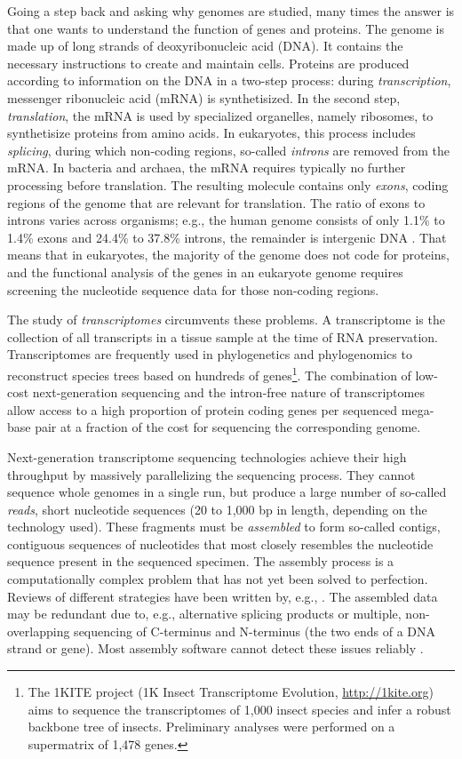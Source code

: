 Going a step back and asking why genomes are studied, many times the answer is
that one wants to understand the function of genes and proteins. The genome is
made up of long strands of deoxyribonucleic acid (DNA). It contains the
necessary instructions to create and maintain cells.  Proteins are produced
according to information on the DNA in a two-step process: during
\emph{transcription}, messenger ribonucleic acid (mRNA) is synthetisized. In the
second step, \emph{translation}, the mRNA is used by specialized organelles,
namely ribosomes, to synthetisize proteins from amino acids. In eukaryotes, this
process includes \emph{splicing}, during which non-coding regions, so-called
\emph{introns} are removed from the mRNA. In bacteria and archaea, the mRNA
requires typically no further processing before translation. The resulting
molecule contains only \emph{exons}, coding regions of the genome that are
relevant for translation. The ratio of exons to introns varies across organisms;
e.g., the human genome consists of only 1.1\% to 1.4\% exons and 24.4\% to
37.8\% introns, the remainder is intergenic DNA \citep{venter2001}. That means
that in eukaryotes, the majority of the genome does not code for proteins, and
the functional analysis of the genes in an eukaryote genome requires screening
the nucleotide sequence data for those non-coding regions.

The study of \emph{transcriptomes} circumvents these problems. A transcriptome
is the collection of all transcripts in a tissue sample at the time of RNA
preservation.  Transcriptomes are frequently used in phylogenetics and
phylogenomics to reconstruct species trees based on hundreds of
genes\footnote{The 1KITE project (1K Insect Transcriptome Evolution,
\url{http://1kite.org}) aims to sequence the transcriptomes of 1,000 insect
species and infer a robust backbone tree of insects. Preliminary analyses were
performed on a supermatrix of 1,478 genes.}.  The combination of low-cost
next-generation sequencing and the intron-free nature of transcriptomes allow
access to a high proportion of protein coding genes per sequenced mega-base pair
at a fraction of the cost for sequencing the corresponding genome.

Next-generation transcriptome sequencing technologies achieve their high
throughput by massively parallelizing the sequencing process. They cannot
sequence whole genomes in a single run, but produce a large number of so-called
\emph{reads}, short nucleotide sequences (20 to 1,000 bp in length, depending on
the technology used). These fragments must be \emph{assembled} to form so-called
contigs, contiguous sequences of nucleotides that most closely resembles the
nucleotide sequence present in the sequenced specimen. The assembly process is a
computationally complex problem that has not yet been solved to perfection.
Reviews of different strategies have been written by, e.g., \citet{zhang2011}.
The assembled data may be redundant due to, e.g., alternative splicing products
\citep{black2003} or multiple, non-overlapping sequencing of C-terminus and
N-terminus (the two ends of a DNA strand or gene). Most assembly software cannot
detect these issues reliably \citep{haiminen2011}. 

